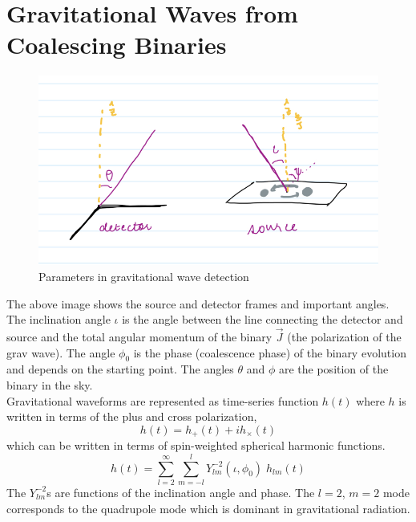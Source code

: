 \documentclass{article}
\begin{document}
\section{Gravitational Waves from Coalescing Binaries}
\begin{figure}[h]
    \centering
    \includegraphics[scale=0.2]{params.jpeg}
    \caption{Parameters in gravitational wave detection}
    \label{fig:my_label}
\end{figure}

The above image shows the source and detector frames and important angles.\\
The inclination angle $\iota$ is the angle between the line connecting the detector and source and the total angular momentum of the binary $\vec{J}$ (the polarization of the grav wave). 
The angle $\phi_0$ is the phase (coalescence phase) of the binary evolution and depends on the starting point. 
The angles $\theta$ and $\phi$ are the position of the binary in the sky.\\
Gravitational waveforms are represented as time-series function $h(t)$ where $h$ is written in terms of the plus and cross polarization, 
\begin{equation}
    h(t) = h_{+}(t) + ih_{\times}(t) \label{ComplexTimeSeries}
\end{equation}
which can be written in terms of spin-weighted spherical harmonic functions.
\begin{equation}
    h(t) = \sum_{l=2}^{\infty} \sum_{m=-l}^{l} Y^{-2}_{lm}(\iota, \phi_0) \; h_{lm}(t) \label{SpinWheighted}
\end{equation}
The $Y^{-2}_{lm}$s are functions of the inclination angle and phase. The $l=2$, $m=2$ mode corresponds to the quadrupole mode which is dominant in gravitational radiation. \\
\end{document}
